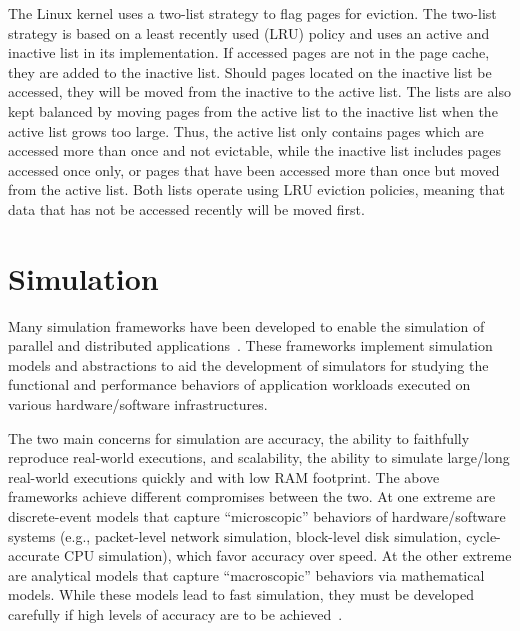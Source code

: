 The Linux kernel uses a two-list strategy to flag pages for eviction.
The two-list strategy is based on a least recently used (LRU) policy
and uses an active and inactive list in its implementation.
If accessed pages are not in the page cache, they are added to the inactive list.
Should pages located on the inactive list be accessed, they will be moved from
the inactive to the active list.
The lists are also kept balanced by moving pages from the active list
to the inactive list when the active list grows too large.
Thus, the active list only contains pages which are accessed more than once
and not evictable, while the inactive list includes pages accessed once only,
or pages that have been accessed more than once but moved from the active list.
Both lists operate using LRU eviction policies, meaning that data that has
not be accessed recently will be moved first.

\section{Simulation}

Many simulation frameworks have been developed to enable the
simulation of parallel and distributed
applications~\cite{optorsim, gridsim, groudsim, cloudsim,
nunez2012simcan,nunez2012icancloud, mdcsim, dissect_cf,
cloudnetsimplusplus, fognetsimplusplus, casanova2014simgrid,
ROSS, casanova2020fgcs}. These frameworks implement simulation
models and abstractions to aid the development of simulators
for studying the functional and performance behaviors of
application workloads executed on various hardware/software
infrastructures. 

The two main concerns for simulation are accuracy,
the ability to faithfully reproduce real-world executions, and
scalability, the ability to simulate large/long real-world
executions quickly and with low RAM footprint. The above
frameworks achieve different compromises between the two.  At
one extreme are discrete-event models that capture
``microscopic'' behaviors of hardware/software systems (e.g.,
packet-level network simulation, block-level disk simulation,
cycle-accurate CPU simulation), which favor accuracy over
speed.  At the other extreme are analytical models that capture
``macroscopic'' behaviors via mathematical models.  While these
models lead to fast simulation, they must be developed
carefully if high levels of accuracy are to be
achieved~\cite{velhoTOMACS2013}. 

